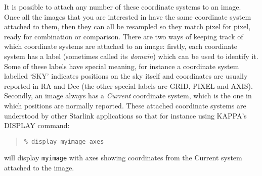 \documentclass[twoside,11pt]{article}
\newcommand{\xref}[3]{#1}
\renewcommand{\_}{\texttt{\symbol{95}}}
\newenvironment{myquote}{\begin{quote}\begin{small}}{\end{small}\end{quote}}
\begin{document}
It is possible to attach any number of these coordinate systems 
to an image.  Once all the images that you are interested in
have the same coordinate system attached to them, then
they can all be resampled so they match pixel for pixel,
ready for combination or comparison.
There are two ways of keeping track of which coordinate systems
are attached to an image: firstly, each coordinate system has a label 
(sometimes called its {\em domain\/}) which can be used to identify it.
Some of these
labels have special meaning, for instance a coordinate system labelled 
`SKY' indicates
positions on the sky itself and coordinates are usually reported in
RA and Dec
(the other special labels are GRID, PIXEL and AXIS).
Secondly, an image
always has a {\em Current\/} coordinate system, which is the
one in which positions are normally reported.
These attached 
coordinate systems are understood by other Starlink applications
so that for instance using KAPPA's
\xref{DISPLAY}{sun95}{DISPLAY} command:
\begin{myquote}
\begin{verbatim}
% display myimage axes
\end{verbatim}
\end{myquote}
will display {\tt myimage} with axes showing coordinates from
the Current system attached to the image.
\end{document}

